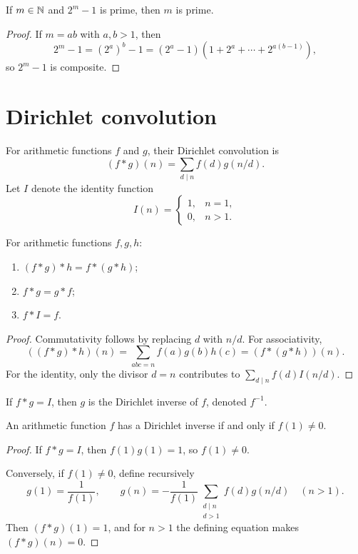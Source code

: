 \begin{thm}
If $m\in\mathbb{N}$ and $2^m-1$ is prime, then $m$ is prime.
\end{thm}
\begin{proof}
If $m=ab$ with $a,b>1$, then
\[
 2^m-1=(2^a)^b-1=(2^a-1)(1+2^a+\cdots+2^{a(b-1)}),
\]
so $2^m-1$ is composite.
\end{proof}

\section{Dirichlet convolution}

\begin{de}
For arithmetic functions $f$ and $g$, their Dirichlet convolution is
\[
 (f*g)(n)=\sum_{d\mid n}f(d)g(n/d).
\]
Let $I$ denote the identity function
\[
 I(n)=\begin{cases}1,&n=1,\\0,&n>1.\end{cases}
\]
\end{de}

\begin{thm}
For arithmetic functions $f,g,h$:
\begin{enumerate}[label=(\alph*)]
\item $(f*g)*h=f*(g*h)$;
\item $f*g=g*f$;
\item $f*I=f$.
\end{enumerate}
\end{thm}
\begin{proof}
Commutativity follows by replacing $d$ with $n/d$.  For associativity,
\[
 ((f*g)*h)(n)
 =\sum_{abc=n}f(a)g(b)h(c)
 =(f*(g*h))(n).
\]
For the identity, only the divisor $d=n$ contributes to
$\sum_{d\mid n}f(d)I(n/d)$.
\end{proof}

\begin{de}
If $f*g=I$, then $g$ is the Dirichlet inverse of $f$, denoted $f^{-1}$.
\end{de}

\begin{thm}
An arithmetic function $f$ has a Dirichlet inverse if and only if $f(1)\ne0$.
\end{thm}
\begin{proof}
If $f*g=I$, then $f(1)g(1)=1$, so $f(1)\ne0$.

Conversely, if $f(1)\ne0$, define recursively
\[
 g(1)=\frac1{f(1)},
 \qquad
 g(n)=-\frac1{f(1)}
 \sum_{\substack{d\mid n\\d>1}}f(d)g(n/d)
 \quad(n>1).
\]
Then $(f*g)(1)=1$, and for $n>1$ the defining equation makes $(f*g)(n)=0$.
\end{proof}

